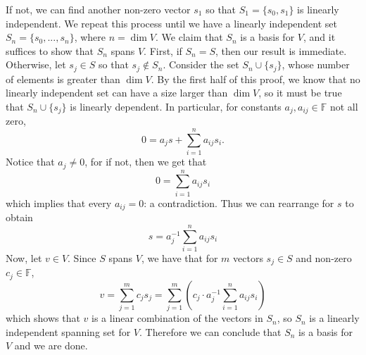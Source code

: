 \documentclass{article}
\theoremstyle{plain} %
\numberwithin{thm}{section} %
\theoremstyle{definition}
\begin{document}
\begin{question}{5}
        If not, we can find another non-zero vector \(s_1\) so that \(S_1 = \{ s_0, s_1 \}\) is linearly independent. We repeat this process until we have a linearly independent set \(S_n = \{ s_0, ..., s_{n} \}\), where \(n = \dim V\). We claim that \(S_n\) is a basis for \(V\), and it suffices to show that \(S_n\) spans \(V\). First, if \(S_n = S\), then our result is immediate. Otherwise, let \(s_j \in S\) so that \(s_j \notin S_n\). Consider the set \(S_n \cup \{ s_j \}\), whose number of elements is greater than \(\dim V\). By the first half of this proof, we know that no linearly independent set can have a size larger than \(\dim V\), so it must be true that \(S_n \cup \{ s_j \}\) is linearly dependent. In particular, for constants \(a_j,a_{ij} \in \mathbb{F}\) not all zero,
        \[
            0 = a_js + \sum_{i=1}^{n} a_{ij} s_{i}.
        \]
        Notice that \(a_j \neq 0\), for if not, then we get that
        \[
            0 = \sum_{i=1}^{n} a_{ij} s_{i}
        \]
        which implies that every \(a_{ij} = 0\): a contradiction. Thus we can rearrange for \(s\) to obtain
        \[
            s = a_j^{-1} \sum_{i=1}^{n} a_{ij} s_{i}
        \]
        Now, let \(v \in V\). Since \(S\) spans \(V\), we have that for \(m\) vectors \(s_j \in S\) and non-zero \(c_j \in \mathbb{F}\),
        \[
            v = \sum_{j=1}^{m} c_j s_j = \sum_{j=1}^{m} \left( c_j \cdot a_j^{-1} \sum_{i=1}^{n} a_{ij} s_{i} \right)
        \]
        which shows that \(v\) is a linear combination of the vectors in \(S_n\), so \(S_n\) is a linearly independent spanning set for \(V\). Therefore we can conclude that \(S_n\) is a basis for \(V\) and we are done.
    \end{question}
    \newpage
\end{document}

